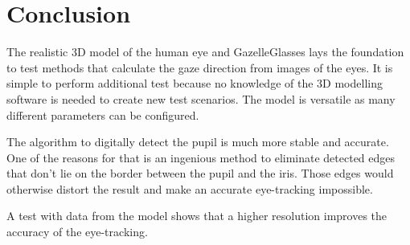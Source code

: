 \chapter{Conclusion}
\label{chap:conclusions}
The realistic 3D model of the human eye and GazelleGlasses lays the foundation to test methods that calculate the gaze direction from images of the eyes. It is simple to perform additional test because no knowledge of the 3D modelling software is needed to create new test scenarios. The model is versatile as many different parameters can be configured. 

The algorithm to digitally detect the pupil is much more stable and accurate. One of the reasons for that is an ingenious method to eliminate detected edges that don't lie on the border between the pupil and the iris. Those edges would otherwise distort the result and make an accurate eye-tracking impossible.

A test with data from the model shows that a higher resolution improves the accuracy of the eye-tracking. 
